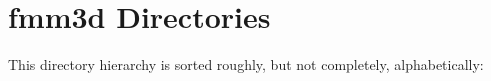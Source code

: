\section{fmm3d Directories}
This directory hierarchy is sorted roughly, but not completely, alphabetically:\begin{CompactList}
\item {}
\end{CompactList}
